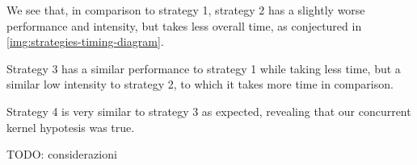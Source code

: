 
We see that, in comparison to strategy 1, strategy 2 has a slightly worse performance and intensity, but takes less overall time, as conjectured in \ref{img:strategies-timing-diagram}.

Strategy 3 has a similar performance to strategy 1 while taking less time, but a similar low intensity to strategy 2, to which it takes more time in comparison.

Strategy 4 is very similar to strategy 3 as expected, revealing that our concurrent kernel hypotesis was true.

TODO: considerazioni
